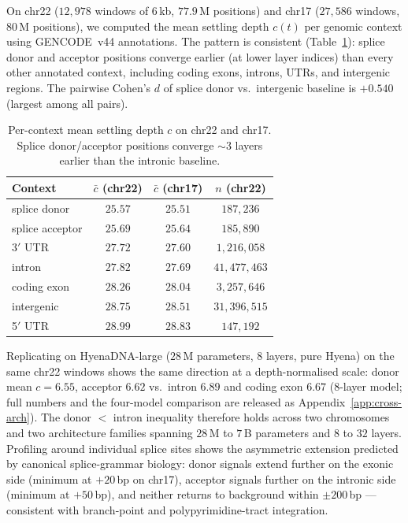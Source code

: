 \documentclass[12pt]{article}
\theoremstyle{plain}
\theoremstyle{definition}
\theoremstyle{remark}
\begin{document}
On chr22 ($12{,}978$ windows of 6\,kb, $77.9$\,M positions) and chr17
($27{,}586$ windows, $80$\,M positions), we computed the mean settling
depth $c(t)$ per genomic context using GENCODE~v44 annotations. The
pattern is consistent (Table~\ref{tab:splice}): splice donor and
acceptor positions converge earlier (at lower layer indices) than every
other annotated context, including coding exons, introns, UTRs, and
intergenic regions. The pairwise Cohen's $d$ of splice donor vs.\
intergenic baseline is $+0.540$ (largest among all pairs).

\begin{table}[t]
\caption{Per-context mean settling depth $c$ on chr22 and chr17. Splice
donor/acceptor positions converge $\sim 3$ layers earlier than the
intronic baseline.}
\label{tab:splice}
\centering
\small
\begin{tabular}{@{}lccc@{}}
\toprule
Context & $\bar{c}$ (chr22) & $\bar{c}$ (chr17) & $n$ (chr22) \\
\midrule
splice donor    & $25.57$ & $25.51$ & $187{,}236$ \\
splice acceptor & $25.69$ & $25.64$ & $185{,}890$ \\
3$'$ UTR        & $27.72$ & $27.60$ & $1{,}216{,}058$ \\
intron          & $27.82$ & $27.69$ & $41{,}477{,}463$ \\
coding exon     & $28.26$ & $28.04$ & $3{,}257{,}646$ \\
intergenic      & $28.75$ & $28.51$ & $31{,}396{,}515$ \\
5$'$ UTR        & $28.99$ & $28.83$ & $147{,}192$ \\
\bottomrule
\end{tabular}
\end{table}

Replicating on HyenaDNA-large ($28$\,M parameters, 8 layers, pure
Hyena) on the same chr22 windows shows the same direction at a
depth-normalised scale: donor mean $c = 6.55$, acceptor $6.62$ vs.\
intron $6.89$ and coding exon $6.67$ (8-layer model; full numbers and
the four-model comparison are released as Appendix~\ref{app:cross-arch}).
The donor $<$ intron inequality therefore holds across two chromosomes
and two architecture families spanning $28$\,M to $7$\,B parameters and
$8$ to $32$ layers. Profiling around individual splice sites shows the
asymmetric extension predicted by canonical splice-grammar biology:
donor signals extend further on the exonic side (minimum at $+20$\,bp
on chr17), acceptor signals further on the intronic side (minimum at
$+50$\,bp), and neither returns to background within $\pm 200$\,bp ---
consistent with branch-point and polypyrimidine-tract integration.
\end{document}
